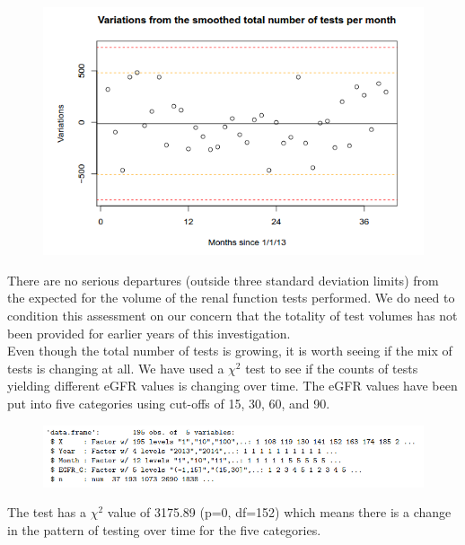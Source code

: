 ﻿\documentclass[11pt]{article}
\begin{document}
\begin{figure}[htp]
\centering
\includegraphics[scale=0.50]{fig4.png}
\caption{}
\label{}
\end{figure}

There are no serious departures (outside three standard deviation limits) from the expected for the volume of the renal function tests performed. We do need to condition this assessment on our concern that the totality of test volumes has not been provided for earlier years of this investigation. \\

Even though the total number of tests is growing, it is worth seeing if the mix of tests is changing at all. We have used a $\chi^2$ test to see if the counts of tests yielding different eGFR values is changing over time. The eGFR values have been put into five categories using cut-offs of 15, 30, 60, and 90.\\

\begin{figure}[htp]
\centering
\includegraphics[scale=0.50]{fig5.png}
\caption{}
\label{}
\end{figure}

The test has a $\chi^2$ value of 3175.89 (p=0, df=152) which means there is a change in the pattern of testing over time for the five categories.\\
\end{document}
